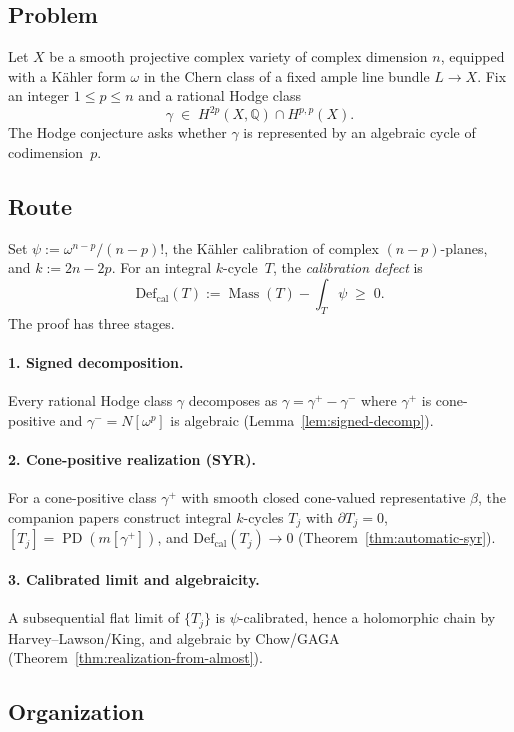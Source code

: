\documentclass[11pt]{article}
\numberwithin{equation}{section}
\theoremstyle{plain}
\theoremstyle{definition}
\theoremstyle{remark}
\DeclareMathOperator{\Mass}{Mass}
\DeclareMathOperator{\PD}{PD}
\newcommand{\Q}{\mathbb{Q}}
\newcommand{\Def}{\mathrm{Def}}
\newcommand{\Defcal}{\Def_{\mathrm{cal}}}
\begin{document}
\subsection*{Problem}

Let $X$ be a smooth projective complex variety of complex dimension $n$,
equipped with a K\"ahler form $\omega$ in the Chern class of a fixed ample line
bundle $L\to X$.  Fix an integer $1 \leq p \leq n$ and a rational Hodge class
\[
\gamma \;\in\; H^{2p}(X,\Q) \cap H^{p,p}(X).
\]
The Hodge conjecture asks whether $\gamma$ is represented by an algebraic cycle
of codimension~$p$.

\subsection*{Route}

Set $\psi:=\omega^{n-p}/(n-p)!$, the K\"ahler calibration of complex
$(n{-}p)$-planes, and $k:=2n-2p$.  For an integral $k$-cycle~$T$, the
\emph{calibration defect} is
\[
\Defcal(T):=\Mass(T)-\int_T\psi\;\ge\;0.
\]
The proof has three stages.

\paragraph{1. Signed decomposition.}
Every rational Hodge class $\gamma$ decomposes as
$\gamma=\gamma^+-\gamma^-$ where $\gamma^+$ is cone-positive and
$\gamma^-=N[\omega^p]$ is algebraic (Lemma~\ref{lem:signed-decomp}).

\paragraph{2. Cone-positive realization (SYR).}
For a cone-positive class $\gamma^+$ with smooth closed cone-valued
representative $\beta$, the companion papers construct integral
$k$-cycles $T_j$ with $\partial T_j=0$, $[T_j]=\PD(m[\gamma^+])$,
and $\Defcal(T_j)\to 0$ (Theorem~\ref{thm:automatic-syr}).

\paragraph{3. Calibrated limit and algebraicity.}
A subsequential flat limit of $\{T_j\}$ is $\psi$-calibrated, hence a
holomorphic chain by Harvey--Lawson/King, and algebraic by Chow/GAGA
(Theorem~\ref{thm:realization-from-almost}).

\subsection*{Organization}
\end{document}
